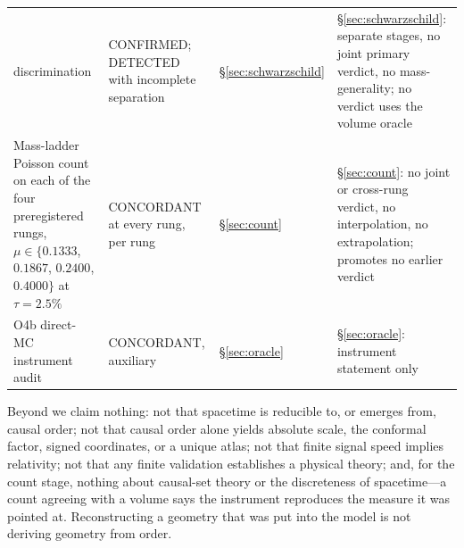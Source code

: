 \begin{table}[t]
\begin{tabular}{@{}>{\raggedright\arraybackslash}p{10.5pc}>{\raggedright\arraybackslash}p{8pc}>{\raggedright\arraybackslash}p{3.6pc}>{\raggedright\arraybackslash}p{10pc}@{}}
discrimination & CONFIRMED; DETECTED with incomplete separation &
\S\ref{sec:schwarzschild} & \S\ref{sec:schwarzschild}: separate stages, no
joint primary verdict, no mass-generality; no verdict uses the volume
oracle \\
Mass-ladder Poisson count on each of the four preregistered rungs,
$\mu \in \{0.1333$, $0.1867$, $0.2400$, $0.4000\}$ at
$\tau = 2.5\%$ & CONCORDANT at every rung, per rung & \S\ref{sec:count} &
\S\ref{sec:count}: no joint or cross-rung verdict, no interpolation, no
extrapolation; promotes no earlier verdict \\
O4b direct-MC instrument audit & CONCORDANT, auxiliary & \S\ref{sec:oracle}
& \S\ref{sec:oracle}: instrument statement only \\
\bottomrule
\end{tabular}
\end{table}

Beyond  we claim nothing: not that spacetime is reducible
to, or emerges from, causal order; not that causal order alone yields
absolute scale, the conformal factor, signed coordinates, or a unique
atlas; not that finite signal speed implies relativity; not that any finite
validation establishes a physical theory; and, for the count stage, nothing
about causal-set theory or the discreteness of spacetime---a count agreeing
with a volume says the instrument reproduces the measure it was pointed at.
Reconstructing a geometry that was put into the model is not deriving
geometry from order.
